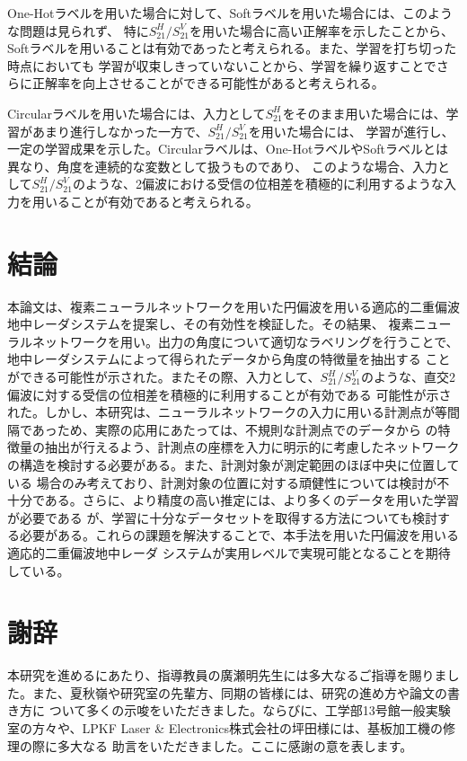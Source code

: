 \documentclass[11pt,a4paper,uplatex]{ujarticle}
\begin{document}
  One-Hotラベルを用いた場合に対して、Softラベルを用いた場合には、このような問題は見られず、
  特に$S_{21}^H/S_{21}^V$を用いた場合に高い正解率を示したことから、Softラベルを用いることは有効であったと考えられる。また、学習を打ち切った時点においても
  学習が収束しきっていないことから、学習を繰り返すことでさらに正解率を向上させることができる可能性があると考えられる。

  Circularラベルを用いた場合には、入力として$S_{21}^H$をそのまま用いた場合には、学習があまり進行しなかった一方で、$S_{21}^H/S_{21}^V$を用いた場合には、
  学習が進行し、一定の学習成果を示した。Circularラベルは、One-HotラベルやSoftラベルとは異なり、角度を連続的な変数として扱うものであり、
  このような場合、入力として$S_{21}^H/S_{21}^V$のような、2偏波における受信の位相差を積極的に利用するような入力を用いることが有効であると考えられる。

\section{結論}
  本論文は、複素ニューラルネットワークを用いた円偏波を用いる適応的二重偏波地中レーダシステムを提案し、その有効性を検証した。その結果、
  複素ニューラルネットワークを用い。出力の角度について適切なラベリングを行うことで、地中レーダシステムによって得られたデータから角度の特徴量を抽出する
  ことができる可能性が示された。またその際、入力として、$S_{21}^H/S_{21}^V$のような、直交2偏波に対する受信の位相差を積極的に利用することが有効である
  可能性が示された。しかし、本研究は、ニューラルネットワークの入力に用いる計測点が等間隔であっため、実際の応用にあたっては、不規則な計測点でのデータから
  の特徴量の抽出が行えるよう、計測点の座標を入力に明示的に考慮したネットワークの構造を検討する必要がある。また、計測対象が測定範囲のほぼ中央に位置している
  場合のみ考えており、計測対象の位置に対する頑健性については検討が不十分である。さらに、より精度の高い推定には、より多くのデータを用いた学習が必要である
  が、学習に十分なデータセットを取得する方法についても検討する必要がある。これらの課題を解決することで、本手法を用いた円偏波を用いる適応的二重偏波地中レーダ
  システムが実用レベルで実現可能となることを期待している。

\newpage

\section{謝辞}

  本研究を進めるにあたり、指導教員の廣瀬明先生には多大なるご指導を賜りました。また、夏秋嶺や研究室の先輩方、同期の皆様には、研究の進め方や論文の書き方に
  ついて多くの示唆をいただきました。ならびに、工学部13号館一般実験室の方々や、LPKF Laser \& Electronics株式会社の坪田様には、基板加工機の修理の際に多大なる
  助言をいただきました。ここに感謝の意を表します。



\end{document}
